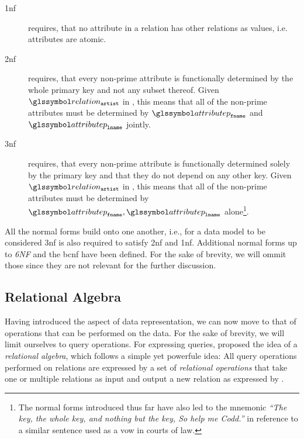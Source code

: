 \begin{description}
    \item[\acrfull{1nf}] requires, that no attribute in a relation has other relations as values, i.e. attributes are atomic.
    \item[\acrfull{2nf}] requires, that every non-prime attribute is functionally determined by the whole primary key and not any subset thereof. Given $\relation_{\mathtt{artist}}$ in , this means that all of the non-prime attributes must be determined by $\attributep_{\mathtt{fname}}$ and $\attributep_{\mathtt{lname}}$ jointly.
    \item[\acrfull{3nf}] requires, that every non-prime attribute is functionally determined solely by the primary key and that they do not depend on any other key. Given $\relation_{\mathtt{artist}}$ in , this means that all of the non-prime attributes must be determined by $\attributep_{\mathtt{fname}}, \attributep_{\mathtt{lname}}$ alone\footnote{The normal forms introduced thus far have also led to the mnemonic \emph{``The key, the whole key, and nothing but the key, So help me Codd.''} in reference to a similar sentence used as a vow in courts of law.}.
\end{description}

All the normal forms build onto one another, i.e., for a data model to be considered \acrshort{3nf} is also required to satisfy \acrshort{2nf}  and \acrshort{1nf}. Additional normal forms up to \emph{6NF} and the \acrfull{bcnf} have been defined. For the sake of brevity, we will ommit those since they are not relevant for the further discussion.

\subsection{Relational Algebra}
\label{section:rel_algebra}

Having introduced the aspect of data representation, we can now move to that of operations that can be performed on the data. For the sake of brevity, we will limit ourselves to query operations. For expressing queries, \cite{Codd:1970Relational} proposed the idea of a \emph{relational algebra}, which follows a simple yet powerfule idea: All query operations performed on relations are expressed by a set of \emph{relational operations} that take one or multiple relations as input and output a new relation as expressed by .

